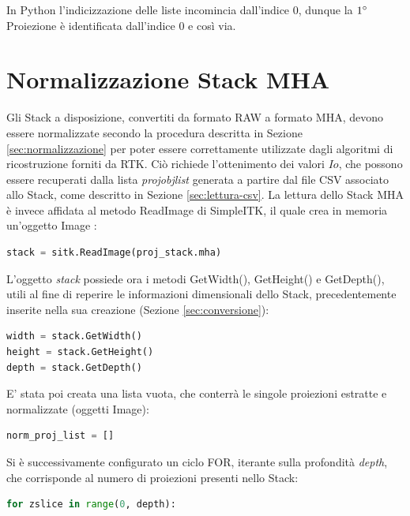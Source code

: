 \documentclass[a4paper,12pt, doubleside]{report}
\begin{document}
               In Python l'indicizzazione delle liste incomincia dall'indice $0$, dunque la $1\degree$ Proiezione è identificata dall'indice $0$ e così via.
        
        \section{Normalizzazione Stack MHA}
            \label{sec:norm-disp}
            
            \par
                Gli Stack a disposizione, convertiti da formato RAW a formato MHA, devono essere normalizzate secondo la procedura descritta in Sezione \ref{sec:normalizzazione} per poter essere correttamente utilizzate dagli algoritmi di ricostruzione forniti da RTK. Ciò richiede l'ottenimento dei valori $Io$, che possono essere recuperati dalla lista \textit{proj\textunderscore obj\textunderscore list} generata a partire dal file CSV associato allo Stack, come descritto in Sezione \ref{sec:lettura-csv}. La lettura dello Stack MHA è invece affidata al metodo ReadImage di SimpleITK, il quale crea in memoria un'oggetto Image \cite{sitk-image}:
                
                \begin{lstlisting}[language=python, frame=bt]
stack = sitk.ReadImage(proj_stack.mha)
                \end{lstlisting}
                
                L'oggetto \textit{stack} possiede ora i metodi GetWidth(), GetHeight() e GetDepth(), utili al fine di reperire le informazioni dimensionali dello Stack, precedentemente inserite nella sua creazione (Sezione \ref{sec:conversione}):
                \begin{lstlisting}[language=python, frame=bt]
width = stack.GetWidth()
height = stack.GetHeight()
depth = stack.GetDepth()
                \end{lstlisting} 
                
                E' stata poi creata una lista vuota, che conterrà le singole proiezioni estratte e normalizzate (oggetti Image):
                \begin{lstlisting}[language=python, frame=bt]
norm_proj_list = []
                \end{lstlisting}
                
                Si è successivamente configurato un ciclo FOR, iterante sulla profondità \textit{depth}, che corrisponde al numero di proiezioni presenti nello Stack:
                \begin{lstlisting}[language=python, frame=bt]
for zslice in range(0, depth):
                \end{lstlisting} 
\end{document}

